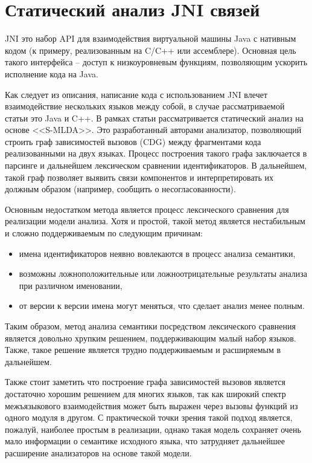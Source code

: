 \section{Статический анализ JNI связей} \label{ssec:jni}

JNI \cite{JNI} это набор API для взаимодействия виртуальной машины Java
с нативным кодом (к примеру, реализованным на C/C++ или ассемблере). Основная цель такого интерфейса --
доступ к низкоуровневым функциям, позволяющим ускорить исполнение кода на Java.

Как следует из описания, написание кода с использованием JNI влечет взаимодействие нескольких языков между
собой, в случае рассматриваемой статьи это Java и C++. В рамках статьи рассматривается статический анализ
на основе <<S-MLDA>>. Это разработанный авторами анализатор, позволяющий строить граф зависимостей вызовов 
(CDG) 
между фрагментами кода реализованными на двух языках. Процесс построения такого
графа заключается в парсинге и дальнейшем лексическом сравнении идентификаторов. В дальнейшем, такой
граф позволяет выявить связи компонентов и интерпретировать их должным образом (например, сообщить о 
несогласованности).

Основным недостатком метода является процесс лексического сравнения для реализации модели анализа.
Хотя и простой, такой метод является нестабильным и сложно поддерживаемым по следующим причинам:
\begin{itemize}
    \item имена идентификаторов неявно вовлекаются в процесс анализа семантики,
    \item возможны ложноположительные или ложноотрицательные результаты анализа при различном именовании,
    \item от версии к версии имена могут меняться, что сделает анализ менее полным.
\end{itemize}

Таким образом, метод анализа семантики посредством лексического сравнения является
довольно хрупким решением, поддерживающим малый набор языков. Также, такое решение является трудно поддерживаемым
и расширяемым в дальнейшем. 

Также стоит заметить что построение графа зависимостей вызовов является достаточно хорошим решением для многих
языков, так как широкий спектр межъязыкового взаимодействия может быть выражен через вызовы функций из одного
модуля в другом. С практической точки зрения такой подход является, пожалуй, наиболее простым в реализации, однако
такая модель сохраняет очень мало информации о семантике исходного языка, что затрудняет дальнейшее расширение
анализаторов на основе такой модели.

